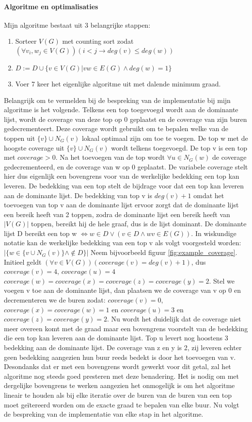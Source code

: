 \documentclass[11pt, a4paper, table]{article}
\theoremstyle{definition}
\begin{document}
\paragraph{Algoritme en optimalisaties}
Mijn algoritme bestaat uit 3 belangrijke stappen: 
\begin{enumerate}
	\item \label{itm:sort} Sorteer $V(G)$ met counting sort zodat $(\forall v_i,w_j \in V(G))(i<j \rightarrow deg(v) \leq deg(w))$
	\item \label{itm:degree1}$D := D \cup \{v \in V(G) | vw \in E(G) \land deg(w)=1\}$
	\item \label{itm:actualalg} Voer 7 keer het eigenlijke algoritme uit met dalende minimum graad. 
\end{enumerate}
Belangrijk om te vermelden bij de bespreking van de implementatie bij mijn algoritme is het volgende. Telkens een top toegevoegd wordt aan de dominante lijst, wordt de coverage van deze top op 0 geplaatst en de coverage van zijn buren gedecrementeert. Deze coverage wordt gebruikt om te bepalen welke van de toppen uit $\{v\} \cup N_G(v)$ lokaal optimaal zijn om toe te voegen. De top w met de hoogste coverage uit $\{v\} \cup N_G(v)$ wordt telkens toegevoegd. De top v is een top met $coverage > 0$. Na het toevoegen van de top wordt $\forall u \in N_G(w)$ de coverage gedecrementeerd, en de coverage van w op 0 geplaatst. De variabele coverage stelt hier dus eigenlijk een bovengrens voor van de werkelijke bedekking een top kan leveren. De bedekking van een top stelt de bijdrage voor dat een top kan leveren aan de dominante lijst. De bedekking van top v is $deg(v)+1$ omdat het toevoegen van top v aan de dominante lijst ervoor zorgt dat de dominante lijst een bereik heeft van 2 toppen, zodra de dominante lijst een bereik heeft van $|V(G)|$ toppen, bereikt hij de hele graaf, dus is de lijst dominant. De dominante lijst D bereikt een top w $\iff w \in D \lor (v \in D \land wv \in E(G))$.  In wiskundige notatie kan de werkelijke bedekking van een top v als volgt voorgesteld worden:  $|\{w \in \{v \cup N_G(v)\} \land \not\in D\}|$
Neem bijvoorbeeld figuur \ref{fig:example_coverage}. Initieel geldt $(\forall v \in V(G))( coverage(v)=deg(v)+1)$, dus $coverage(v)=4$, $coverage(u)=4$ $coverage(w)=coverage(x)=coverage(z)=coverage(y)=2$.
Stel we voegen v toe aan de dominante lijst, dan plaatsen we de coverage van v op 0 en decrementeren we de buren zodat: $coverage(v)=0$,  $coverage(x)=coverage(w)=1$ 
en $coverage(u)=3$ en $coverage(z)=coverage(y)=2$. Nu wordt het duidelijk dat de coverage niet meer overeen komt met de graad maar een bovengrens voorstelt van de bedekking die een top kan leveren aan de dominante lijst. Top u levert nog hoostens 3 bedekking aan de dominante lijst. De coverage van z en y is 2, zij leveren echter geen bedekking aangezien hun buur reeds bedekt is door het toevoegen van v. Desondanks dat er met een bovengrens wordt gewerkt voor dit getal, zal het algoritme nog steeds goed presteren met deze benadering. Het is nodig om met dergelijke bovengrens te werken aangezien het onmogelijk is om het algoritme lineair te houden als bij elke iteratie over de buren van de buren van een top moet ge\"{i}tereerd worden om de exacte graad te bepalen van elke buur. Nu volgt de bespreking van de implementatie van elke stap in het algoritme.
\end{document}
